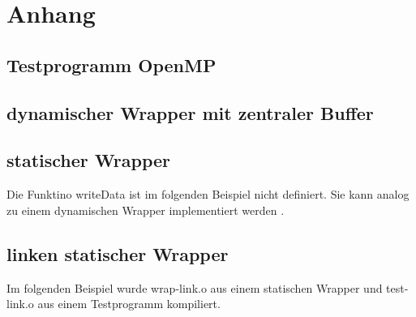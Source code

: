 \chapter{Anhang}
\label{sec:a-kapitel}

\section{Testprogramm OpenMP}
\label{sec:testprogramm_openmp}



\section{dynamischer Wrapper mit zentraler Buffer}
\label{sec:dynamischer_wrapper_mit_zentraler_buffer}



\section{statischer Wrapper}
\label{sec:statischer_wrapper}

Die Funktino writeData ist im folgenden Beispiel nicht definiert. Sie kann analog zu einem dynamischen Wrapper implementiert werden .


\section{linken statischer Wrapper}
\label{sec:linken_statischer_wrapper}

Im folgenden Beispiel wurde wrap-link.o aus einem statischen Wrapper  und test-link.o aus einem Testprogramm  kompiliert.
